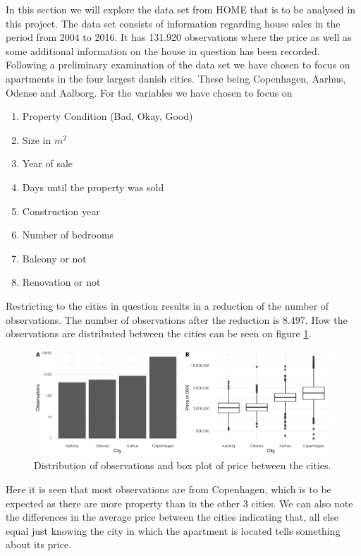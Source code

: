 In this section we will explore the data set from HOME that is to be analysed in this project.
The data set consists of information regarding house sales in the period from 2004 to 2016.
It has 131.920 observations where the price as well as some additional information on the house in question has been recorded.
Following a preliminary examination of the data set we have chosen to focus on apartments in the four largest danish cities. 
These being Copenhagen, Aarhus, Odense and Aalborg.
For the variables we have chosen to focus on
\begin{enumerate}
    \item Property Condition (Bad, Okay, Good)
    \item Size in $m^2$
    \item Year of sale
    \item Days until the property was sold
    \item Construction year
    \item Number of bedrooms
    \item Balcony or not
    \item Renovation or not
\end{enumerate}
Restricting to the cities in question results in a reduction of the number of observations.
The number of observations after the reduction is 8.497.
How the observations are distributed between the cities can be seen on figure \ref{fig:distributions_between_cities}.
\begin{figure}[H]
    \centering
    \includegraphics[width=\textwidth]{figures/Data_introduction/distribution_between_cities.pdf}
    \caption{Distribution of observations and box plot of price between the cities.}
    \label{fig:distributions_between_cities}
\end{figure}
Here it is seen that most observations are from Copenhagen, which is to be expected as there are more property than in the other 3 cities.
We can also note the differences in the average price between the cities indicating that, all else equal just knowing the city in which the apartment is located tells something about its price.